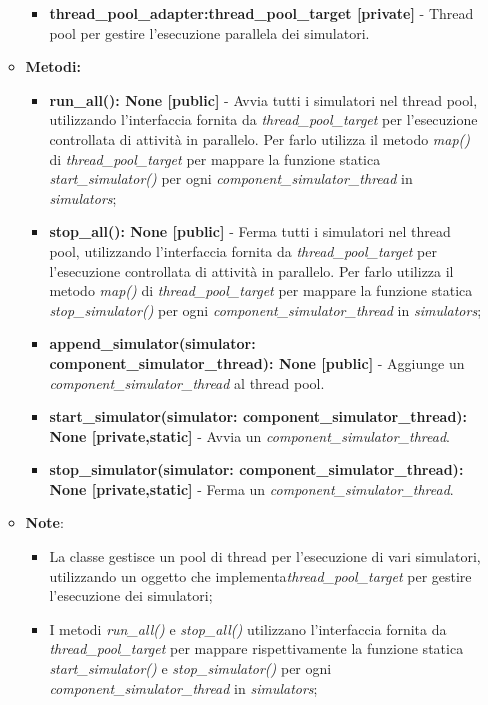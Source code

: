 \begin{itemize}
\begin{itemize}
\begin{itemize}
            \item \textbf{thread\_pool\_adapter:thread\_pool\_target [private]} - Thread pool per gestire l'esecuzione parallela dei simulatori.
        \end{itemize}
        \item \textbf{Metodi: }
        \begin{itemize}
            \item \textbf{run\_all(): None [public]} - Avvia tutti i simulatori nel thread pool, utilizzando l'interfaccia fornita da \textit{thread\_pool\_target} per l'esecuzione controllata di attività in parallelo.
            Per farlo utilizza il metodo \textit{map()} di \textit{thread\_pool\_target} per mappare la funzione statica \textit{start\_simulator()} per ogni \textit{component\_simulator\_thread} in \textit{simulators};
            \item \textbf{stop\_all(): None [public]} - Ferma tutti i simulatori nel thread pool, utilizzando l'interfaccia fornita da \textit{thread\_pool\_target} per l'esecuzione controllata di attività in parallelo.
            Per farlo utilizza il metodo \textit{map()} di \textit{thread\_pool\_target} per mappare la funzione statica \textit{stop\_simulator()} per ogni \textit{component\_simulator\_thread} in \textit{simulators};
            \item \textbf{append\_simulator(simulator: component\_simulator\_thread): None [public]} - Aggiunge un \textit{component\_simulator\_thread} al thread pool.
            \item \textbf{start\_simulator(simulator: component\_simulator\_thread): None [private,static]} - Avvia un \textit{component\_simulator\_thread}.
            \item \textbf{stop\_simulator(simulator: component\_simulator\_thread): None [private,static]} - Ferma un \textit{component\_simulator\_thread}.
        \end{itemize}
        \item\textbf{Note}:
        \begin{itemize}
            \item La classe gestisce un pool di thread per l'esecuzione di vari simulatori, utilizzando un oggetto che implementa\textit{thread\_pool\_target} per gestire l'esecuzione dei simulatori;
            \item I metodi \textit{run\_all()} e \textit{stop\_all()} utilizzano l'interfaccia fornita da \textit{thread\_pool\_target} per mappare rispettivamente la funzione statica \textit{start\_simulator()} e \textit{stop\_simulator()} per ogni \textit{component\_simulator\_thread} in \textit{simulators};

\end{itemize}
\end{itemize}
\end{itemize}
